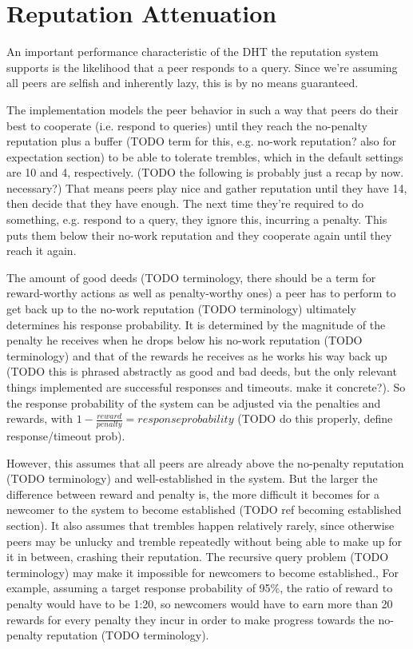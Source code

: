 \section{Reputation Attenuation}
An important performance characteristic of the \ac{DHT} the reputation system
supports is the likelihood that a peer responds to a query. Since we're assuming
all peers are selfish and inherently lazy, this is by no means guaranteed.

The implementation models the peer behavior in such a way that peers do their
best to cooperate (i.e. respond to queries) until they reach the no-penalty
reputation plus a buffer (TODO term for this, e.g. no-work reputation? also for
expectation section) to be able to tolerate trembles, which in the default
settings are 10 and 4, respectively. (TODO the following is probably just a
recap by now. necessary?) That means peers play nice and gather reputation until
they have 14, then decide that they have enough. The next time they're required
to do something, e.g. respond to a query, they ignore this, incurring a penalty.
This puts them below their no-work reputation and they cooperate again until
they reach it again.

The amount of good deeds (TODO terminology, there should be a term for
reward-worthy actions as well as penalty-worthy ones) a peer has to perform to
get back up to the no-work reputation (TODO terminology) ultimately determines
his response probability. It is determined by the magnitude of the penalty he
receives when he drops below his no-work reputation (TODO terminology) and that
of the rewards he receives as he works his way back up (TODO this is phrased
abstractly as good and bad deeds, but the only relevant things implemented are
successful responses and timeouts. make it concrete?). So the response
probability of the system can be adjusted via the penalties and rewards, with $1
- \frac{reward}{penalty} = response probability$ (TODO do this properly, define
response/timeout prob).

However, this assumes that all peers are already above the no-penalty reputation
(TODO terminology) and well-established in the system. But the larger the
difference between reward and penalty is, the more difficult it becomes for a
newcomer to the system to become established (TODO ref becoming established
section). It also assumes that trembles happen relatively rarely, since
otherwise peers may be unlucky and tremble repeatedly without being able to make
up for it in between, crashing their reputation. The recursive query problem
(TODO terminology) may make it impossible for newcomers to become established.,
For example, assuming a target response probability of 95\%, the ratio of reward
to penalty would have to be 1:20, so newcomers would have to earn more than 20
rewards for every penalty they incur in order to make progress towards the
no-penalty reputation (TODO terminology).

